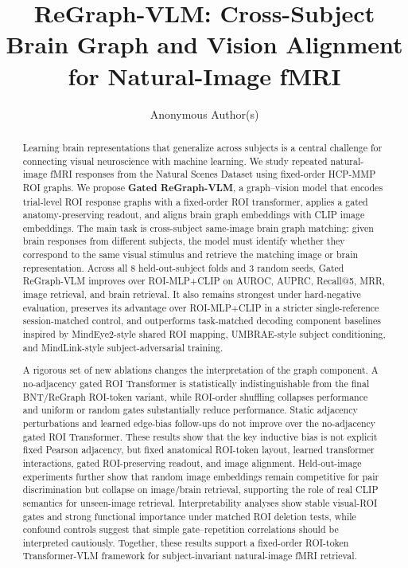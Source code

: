 \documentclass{article}
\title{ReGraph-VLM: Cross-Subject Brain Graph and Vision Alignment for Natural-Image fMRI}
\author{%
  Anonymous Author(s)
}
\begin{document}
\maketitle

\begin{abstract}
Learning brain representations that generalize across subjects is a central challenge for connecting visual neuroscience with machine learning. We study repeated natural-image fMRI responses from the Natural Scenes Dataset using fixed-order HCP-MMP ROI graphs. We propose \textbf{Gated ReGraph-VLM}, a graph--vision model that encodes trial-level ROI response graphs with a fixed-order ROI transformer, applies a gated anatomy-preserving readout, and aligns brain graph embeddings with CLIP image embeddings. The main task is cross-subject same-image brain graph matching: given brain responses from different subjects, the model must identify whether they correspond to the same visual stimulus and retrieve the matching image or brain representation. Across all 8 held-out-subject folds and 3 random seeds, Gated ReGraph-VLM improves over ROI-MLP+CLIP on AUROC, AUPRC, Recall@5, MRR, image retrieval, and brain retrieval. It also remains strongest under hard-negative evaluation, preserves its advantage over ROI-MLP+CLIP in a stricter single-reference session-matched control, and outperforms task-matched decoding component baselines inspired by MindEye2-style shared ROI mapping, UMBRAE-style subject conditioning, and MindLink-style subject-adversarial training.

A rigorous set of new ablations changes the interpretation of the graph component. A no-adjacency gated ROI Transformer is statistically indistinguishable from the final BNT/ReGraph ROI-token variant, while ROI-order shuffling collapses performance and uniform or random gates substantially reduce performance. Static adjacency perturbations and learned edge-bias follow-ups do not improve over the no-adjacency gated ROI Transformer. These results show that the key inductive bias is not explicit fixed Pearson adjacency, but fixed anatomical ROI-token layout, learned transformer interactions, gated ROI-preserving readout, and image alignment. Held-out-image experiments further show that random image embeddings remain competitive for pair discrimination but collapse on image/brain retrieval, supporting the role of real CLIP semantics for unseen-image retrieval. Interpretability analyses show stable visual-ROI gates and strong functional importance under matched ROI deletion tests, while confound controls suggest that simple gate--repetition correlations should be interpreted cautiously. Together, these results support a fixed-order ROI-token Transformer-VLM framework for subject-invariant natural-image fMRI retrieval.
\end{abstract}
\end{document}
